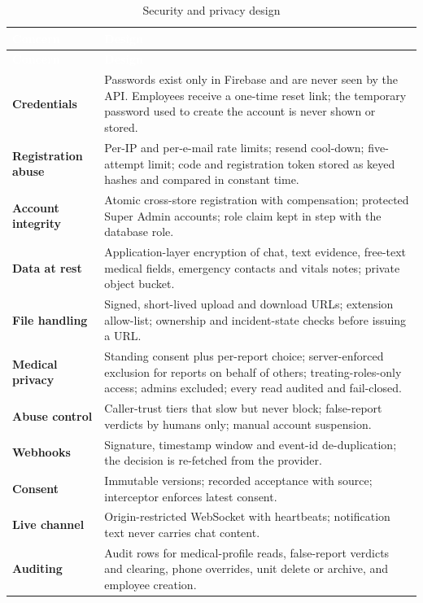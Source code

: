 {\tabfont\rowband
\begin{longtable}{@{}>{\raggedright\arraybackslash}p{}>{\raggedright\arraybackslash}p{}@{}}
\caption{Security and privacy design}\label{tab:security-design}\\
\rowcolor{najdanavy}\textcolor{white}{\sffamily\bfseries\small Concern} & \textcolor{white}{\sffamily\bfseries\small Design}\\
\endfirsthead
\rowcolor{najdanavy}\textcolor{white}{\sffamily\bfseries\small Concern} & \textcolor{white}{\sffamily\bfseries\small Design}\\
\endhead
\bottomrule\endlastfoot
\textbf{Credentials} & Passwords exist only in Firebase and are never seen by the API. Employees receive a one-time reset link; the temporary password used to create the account is never shown or stored.\\
\textbf{Registration abuse} & Per-IP and per-e-mail rate limits; resend cool-down; five-attempt limit; code and registration token stored as keyed hashes and compared in constant time.\\
\textbf{Account integrity} & Atomic cross-store registration with compensation; protected Super Admin accounts; role claim kept in step with the database role.\\
\textbf{Data at rest} & Application-layer encryption of chat, text evidence, free-text medical fields, emergency contacts and vitals notes; private object bucket.\\
\textbf{File handling} & Signed, short-lived upload and download URLs; extension allow-list; ownership and incident-state checks before issuing a URL.\\
\textbf{Medical privacy} & Standing consent plus per-report choice; server-enforced exclusion for reports on behalf of others; treating-roles-only access; admins excluded; every read audited and fail-closed.\\
\textbf{Abuse control} & Caller-trust tiers that slow but never block; false-report verdicts by humans only; manual account suspension.\\
\textbf{Webhooks} & Signature, timestamp window and event-id de-duplication; the decision is re-fetched from the provider.\\
\textbf{Consent} & Immutable versions; recorded acceptance with source; interceptor enforces latest consent.\\
\textbf{Live channel} & Origin-restricted WebSocket with heartbeats; notification text never carries chat content.\\
\textbf{Auditing} & Audit rows for medical-profile reads, false-report verdicts and clearing, phone overrides, unit delete or archive, and employee creation.\\
\end{longtable}}
